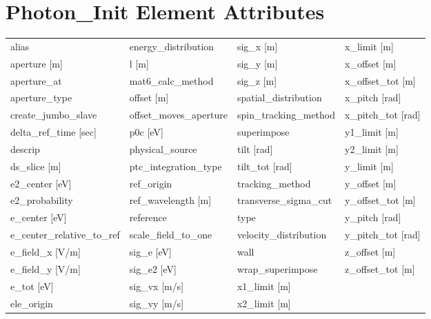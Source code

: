  \section{Photon_Init Element Attributes}
 \label{s:list.photon.init}
 
 \begin{tabular}{llll} \toprule
alias                            & energy_distribution              & sig_x [m]                        & x_limit [m]                      \\
aperture [m]                     & l [m]                            & sig_y [m]                        & x_offset [m]                     \\
aperture_at                      & mat6_calc_method                 & sig_z [m]                        & x_offset_tot [m]                 \\
aperture_type                    & offset [m]                       & spatial_distribution             & x_pitch [rad]                    \\
create_jumbo_slave               & offset_moves_aperture            & spin_tracking_method             & x_pitch_tot [rad]                \\
delta_ref_time [sec]             & p0c [eV]                         & superimpose                      & y1_limit [m]                     \\
descrip                          & physical_source                  & tilt [rad]                       & y2_limit [m]                     \\
ds_slice [m]                     & ptc_integration_type             & tilt_tot [rad]                   & y_limit [m]                      \\
e2_center [eV]                   & ref_origin                       & tracking_method                  & y_offset [m]                     \\
e2_probability                   & ref_wavelength [m]               & transverse_sigma_cut             & y_offset_tot [m]                 \\
e_center [eV]                    & reference                        & type                             & y_pitch [rad]                    \\
e_center_relative_to_ref         & scale_field_to_one               & velocity_distribution            & y_pitch_tot [rad]                \\
e_field_x [V/m]                  & sig_e [eV]                       & wall                             & z_offset [m]                     \\
e_field_y [V/m]                  & sig_e2 [eV]                      & wrap_superimpose                 & z_offset_tot [m]                 \\
e_tot [eV]                       & sig_vx [m/s]                     & x1_limit [m]                     &                                  \\
ele_origin                       & sig_vy [m/s]                     & x2_limit [m]                     &                                  \\
 \bottomrule
 \end{tabular}
 \vfill
 
